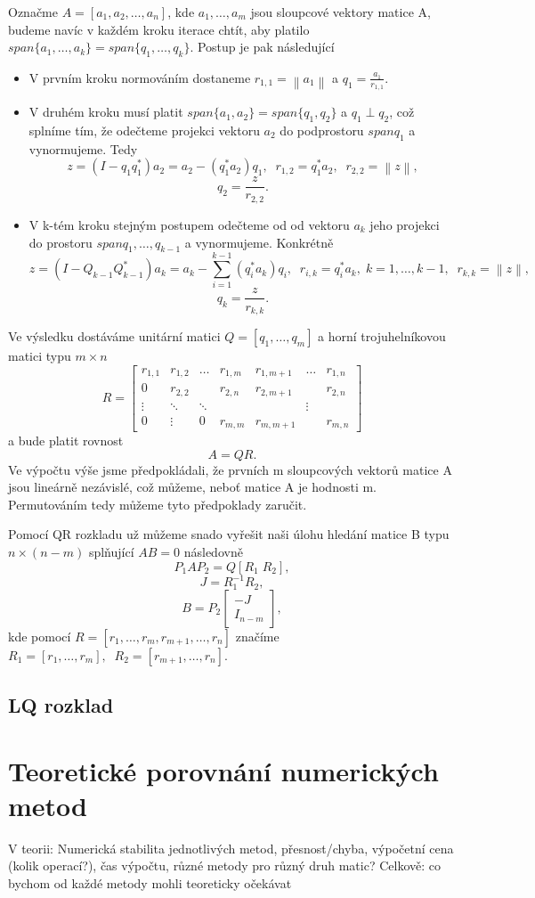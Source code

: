 \documentclass{article}
\theoremstyle{plain}
\theoremstyle{definition}
\begin{document}
Označme $A=[a_1,a_2,\hdots,a_n]$, kde $a_1,\hdots,a_m$ jsou sloupcové vektory matice A, budeme navíc v každém kroku iterace chtít, aby platilo $span\{a_1,\hdots,a_k\}=span\{q_1,\hdots,q_k\}.$ Postup je pak následující
\begin{itemize}
    \item V prvním kroku normováním dostaneme $r_{1,1}= \left \lVert a_1 \right \rVert$ a $q_1 = \frac{a_1}{r_{1,1}}$.
    \item V druhém kroku musí platit $span\{a_1,a_2\}=span\{q_1,q_2\}$ a $q_1 \perp q_2$, což splníme tím, že odečteme projekci vektoru $a_2$ do podprostoru $span{q_1}$ a vynormujeme. Tedy
    \[z=(I - q_1q_1^*)a_2=a_2-(q_1^*a_2)q_1, \;\; r_{1,2}= q_1^*a_2, \;\; r_{2,2}= \left \lVert z \right \rVert,\]
    \[q_2=\frac{z}{r_{2,2}}.\]
    \item V k-tém kroku stejným postupem odečteme od od vektoru $a_k$ jeho projekci do prostoru $span{q_1,\hdots,q_{k-1}}$ a vynormujeme. Konkrétně
    \[z=(I-Q_{k-1}Q_{k-1}^*)a_k=a_k - \sum_{i=1}^{k-1}(q_i^*a_k)q_i,\;\; r_{i,k}=q_i^*a_k,\; k=1,\hdots,k-1,\;\; r_{k,k}=\left \lVert z \right \rVert,\]
    \[q_k=\frac{z}{r_{k,k}}.\]
\end{itemize}
Ve výsledku dostáváme unitární matici $Q=[q_1,\hdots,q_m]$ a horní trojuhelníkovou matici typu $m \times n$
\[R=\begin{bmatrix}
    r_{1,1} & r_{1,2} & \hdots & r_{1,m} & r_{1,m+1} & \hdots & r_{1,n} \\
    0 & r_{2,2} & & r_{2,n} & r_{2,m+1} & & r_{2,n} \\
    \vdots & \ddots & \ddots & & &\vdots \\
    0 & \vdots & 0 & r_{m,m} & r_{m,m+1} & & r_{m,n}
\end{bmatrix}\]
a bude platit rovnost
\[A=QR.\]
Ve výpočtu výše jsme předpokládali, že prvních m sloupcových vektorů matice A jsou lineárně nezávislé, což můžeme, neboť matice A je hodnosti m. Permutováním tedy můžeme tyto předpoklady zaručit.

Pomocí QR rozkladu už můžeme snado vyřešit naši úlohu hledání matice B typu $n \times (n-m)$ splňující $AB=0$ následovně
\[P_1AP_2 = Q[R_1 \; R_2],\]
\[J=R_1^{-1}R_2,\]
\[B=P_2 \begin{bmatrix}
    -J\\
    I_{n-m}
\end{bmatrix},\]
kde pomocí $R=[r_1,\hdots,r_m,r_{m+1},\hdots,r_n]$ značíme $R_1=[r_1,\hdots,r_m],\;\; R_2=[r_{m+1},\hdots,r_n].$
\subsection{LQ rozklad}

\section{Teoretické porovnání numerických metod}
V teorii: Numerická stabilita jednotlivých metod, přesnost/chyba, výpočetní cena (kolik operací?), čas výpočtu, různé metody pro různý druh matic?
Celkově: co bychom od každé metody mohli teoreticky očekávat
\end{document}
